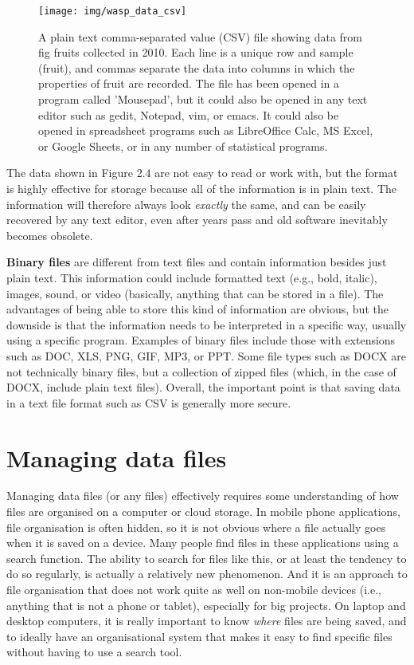\documentclass[
]{scrbook}
\begin{document}
\begin{figure}
\texttt{[image: img/wasp\_data\_csv]} \caption{A plain text comma-separated value (CSV) file showing data from fig fruits collected in 2010. Each line is a unique row and sample (fruit), and commas separate the data into columns in which the properties of fruit are recorded. The file has been opened in a program called 'Mousepad', but it could also be opened in any text editor such as gedit, Notepad, vim, or emacs. It could also be opened in spreadsheet programs such as LibreOffice Calc, MS Excel, or Google Sheets, or in any number of statistical programs.}\label{fig:unnamed-chunk-7}
\end{figure}

The data shown in Figure 2.4 are not easy to read or work with, but the format is highly effective for storage because all of the information is in plain text.
The information will therefore always look \emph{exactly} the same, and can be easily recovered by any text editor, even after years pass and old software inevitably becomes obsolete.

\textbf{Binary files} are different from text files and contain information besides just plain text.
This information could include formatted text (e.g., bold, italic), images, sound, or video (basically, anything that can be stored in a file).
The advantages of being able to store this kind of information are obvious, but the downside is that the information needs to be interpreted in a specific way, usually using a specific program.
Examples of binary files include those with extensions such as DOC, XLS, PNG, GIF, MP3, or PPT.
Some file types such as DOCX are not technically binary files, but a collection of zipped files (which, in the case of DOCX, include plain text files).
Overall, the important point is that saving data in a text file format such as CSV is generally more secure.

\hypertarget{managing-data-files}{%
\section{Managing data files}\label{managing-data-files}}

Managing data files (or any files) effectively requires some understanding of how files are organised on a computer or cloud storage.
In mobile phone applications, file organisation is often hidden, so it is not obvious where a file actually goes when it is saved on a device.
Many people find files in these applications using a search function.
The ability to search for files like this, or at least the tendency to do so regularly, is actually a relatively new phenomenon.
And it is an approach to file organisation that does not work quite as well on non-mobile devices (i.e., anything that is not a phone or tablet), especially for big projects.
On laptop and desktop computers, it is really important to know \emph{where} files are being saved, and to ideally have an organisational system that makes it easy to find specific files without having to use a search tool.
\end{document}
